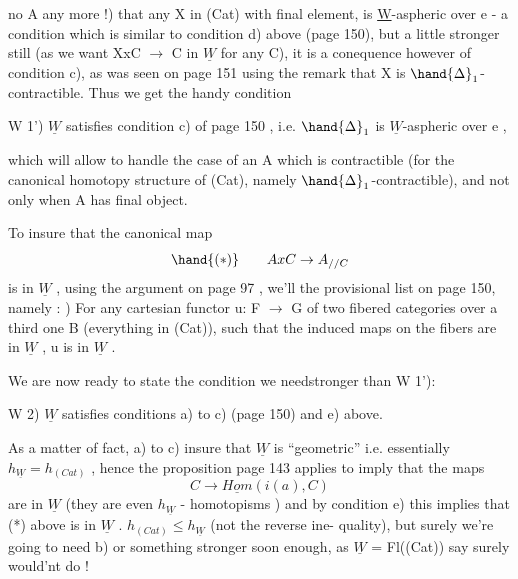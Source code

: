 
no A any more !)  that  any  X in (Cat) with final element, 
is \underline{W}-aspheric over e - a condition which is similar to  condition d)
above (page 150),  but a little stronger still (as we want XxC $\to$ C in $\underline{W}$
for any C),  it is a conequence however of condition c),  as was seen
on page 151  using the remark that X is $\hand{\Delta}_1$-contractible.  Thus we get
the handy condition

W 1')  $\underline{W}$  satisfies condition c) of page 150 ,  i.e. $\hand{\Delta}_1$ is $\underline{W}$-aspheric
over e ,

which will allow  to handle the case of an A which is contractible (for the
canonical homotopy structure of (Cat),  namely $\hand{\Delta}_1$-contractible),  and
not only when A has  final object.

  To insure that the canonical map
\[ \hand{(*)} \qquad AxC \to A_{//C} \]
is in $\underline{W}$ , using the argument on page 97 , we'll  
the provisional list on page 150,  namely :
)  For any cartesian functor u: F $\to$ G of two fibered categories over
a third one B (everything in (Cat)),  such that the induced maps
on the fibers are in $\underline{W}$ ,  u is in $\underline{W}$ .

We are now ready to state the condition we need\over{:}{(}stronger than W 1'):

W 2)  $\underline{W}$  satisfies conditions a) to c) (page 150) and e) above.

As a matter of fact,  a) to c) insure that $\underline{W}$ is ``geometric''  i.e.
essentially $h_{\underline{W}} = h_{(Cat)}$ ,  hence the proposition page 143 applies\hand{,} to 
imply that the maps
\[ C \to \underline{Hom}(i(a),C) \]
are in $\underline{W}$  (they are even $h_{\underline{W}}$ - homotopisms ) and by condition e) this
implies that (*)  above is in $\underline{W}$ .   
   $h_{(Cat)} \leq h_{\underline{W}}$  (not the reverse ine-
quality),  but surely we're going to need b) or something stronger soon
enough,  as $\underline{W}$ = Fl((Cat)) say surely would'nt do !

